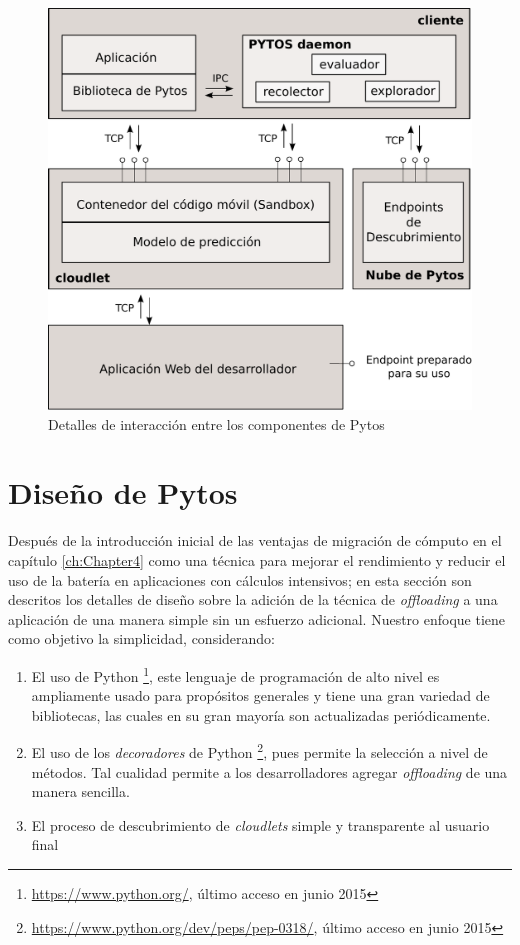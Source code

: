 \begin{figure}
\centering
 \includegraphics[scale=0.55]{Figures/components.pdf}
 \caption{Detalles de interacción entre los componentes de Pytos}
 \label{fig:pytosArchitecture}
\end{figure}


\section{Diseño de Pytos}
\label{sec:pytosDesign}
Después de la introducción inicial de las ventajas de migración de cómputo en el capítulo  \ref{ch:Chapter4} como una técnica para mejorar 
el rendimiento y reducir el uso de la batería en aplicaciones con cálculos intensivos; en esta sección son descritos los detalles de diseño
sobre la adición de la técnica de \textit{offloading} a una aplicación de una manera simple sin un esfuerzo adicional. Nuestro enfoque
tiene como objetivo la simplicidad, considerando:

\begin{enumerate}
 \item El uso de Python \footnote{\url{https://www.python.org/}, último acceso en junio 2015}, este lenguaje de programación de alto nivel es ampliamente usado para propósitos generales y tiene 
 una gran variedad de bibliotecas, las cuales en su gran mayoría son actualizadas periódicamente. 
 \item El uso de los \textit{decoradores} de Python \footnote{\url{https://www.python.org/dev/peps/pep-0318/}, último acceso en junio 2015}, 
 pues permite la selección a nivel de métodos. Tal cualidad permite 
 a los desarrolladores agregar \textit{offloading} de una manera sencilla.
 \item El proceso de descubrimiento de \textit{cloudlets} simple y transparente al usuario final
\end{enumerate}

